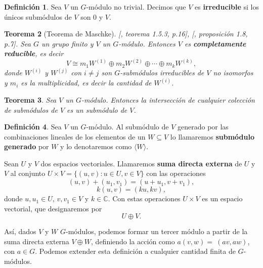 \documentclass[12pt]{book}
\newtheorem{theorem}{Teorema}[section]
\theoremstyle{definition}
\newtheorem{definition}[theorem]{Definición}
\newcounter{in}
\newcounter{ini}
\begin{document}
\begin{definition}
  Sea $V$ un $G$-módulo no trivial. Decimos que $V$ es \textbf{irreducible} si
  los únicos submódulos de $V$ son $0$ y $V$.
\end{definition}


\begin{theorem}[Teorema de Maschke][\cite{sagan2001symmetric}, teorema
  1.5.3, p.16], [\cite{fulton1991representation}, proposición 1.8, p.7].
  \label{maschke}
  Sea $G$ un grupo finito y $V$ un $G$-módulo. Entonces $V$ es
  \textbf{completamente reducible}, es decir
  \begin{equation*}
    V\cong m_{1}W^{(1)}\oplus m_{2}W^{(2)}\oplus\cdots \oplus m_{k}W^{(k)},
  \end{equation*}
donde $W^{(i)}$ y $W^{(j)}$ con $i\neq j$ son $G$-submódulos
irreducibles de $V$ no isomorfos y $m_{i}$ es la multiplicidad, es
decir la cantidad de $W^{(i)}$.
\end{theorem}
\begin{theorem}
  \label{interseccion-submodulos}
  Sea $V$ un $G$-módulo. Entonces la intersección de cualquier
  colección de submódulos de $V$ es un submódulo de $V$.
\end{theorem}

\begin{definition}
  Sea $V$ un $G$-módulo. Al submódulo de $V$ generado por las combinaciones lineales de los
  elementos de un $W\subseteq V$ lo llamaremos \textbf{submódulo generado} por $W$ y lo denotaremos como $\langle W\rangle$.
\end{definition}

Sean $U$ y $V$ dos espacios vectoriales. Llamaremos \textbf{suma
  directa externa} de
$U$ y $V$ al conjunto $U\times V=\{(u,v):u\in U,v\in V\}$ con las operaciones
$$(u,v)+(u_{1},v_{1})=(u+u_{1},v+v_{1}),$$
$$k(u,v)=(ku,kv),$$
donde $u,u_{1}\in U$, $v,v_{1}\in V$ y $k\in \mathbb{C}$. Con estas
operaciones $U\times V$ es un espacio vectorial, que designaremos por
$$U\oplus V.$$

Así, dados $V$ y $W$ $G$-módulos, podemos formar un tercer módulo a partir
de la suma directa externa $V\oplus W$, definiendo la acción como
$a(v,w)=~(av,aw)$, con $a\in G$. Podemos extender esta definición a cualquier
cantidad finita de $G$-módulos.
\end{document}

